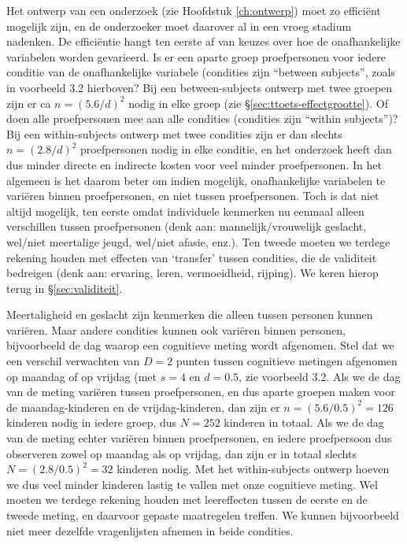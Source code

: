 \documentclass[
]{book}
\begin{document}
Het ontwerp van een onderzoek (zie
Hoofdstuk \ref{ch:ontwerp}) moet zo efficiënt mogelijk zijn, en de
onderzoeker moet daarover al in een vroeg stadium nadenken. De
efficiëntie hangt ten eerste af van keuzes over hoe de onafhankelijke
variabelen worden gevarieerd. Is er een aparte groep proefpersonen voor
iedere conditie van de onafhankelijke variabele (condities zijn ``between
subjects'', zoals in voorbeeld 3.2 hierboven? Bij een between-subjects
ontwerp met twee groepen zijn er ca \(n=(5.6/d)^2\) nodig in elke groep \citep{Gelm07}
(zie §\ref{sec:ttoets-effectgrootte}). Of doen alle proefpersonen mee
aan alle condities (condities zijn ``within subjects'')? Bij een
within-subjects ontwerp met twee condities zijn er dan slechts
\(n=(2.8/d)^2\) proefpersonen nodig in elke conditie, en het onderzoek
heeft dan dus minder directe en indirecte kosten voor veel minder
proefpersonen. In het algemeen is het daarom beter om indien mogelijk,
onafhankelijke variabelen te variëren binnen proefpersonen, en niet
tussen proefpersonen. Toch is dat niet altijd mogelijk, ten eerste omdat
individuele kenmerken nu eenmaal alleen verschillen tussen proefpersonen
(denk aan: mannelijk/vrouwelijk geslacht, wel/niet meertalige jeugd,
wel/niet afasie, enz.). Ten tweede moeten we terdege rekening houden met
effecten van `transfer' tussen condities, die de validiteit bedreigen
(denk aan: ervaring, leren, vermoeidheid, rijping). We keren hierop
terug in §\ref{sec:validiteit}.

Meertaligheid en geslacht zijn kenmerken die alleen tussen personen
kunnen variëren. Maar andere condities kunnen ook variëren binnen
personen, bijvoorbeeld de dag waarop een cognitieve meting wordt
afgenomen. Stel dat we een verschil verwachten van \(D=2\) punten tussen
cognitieve metingen afgenomen op maandag of op vrijdag (met \(s=4\) en
\(d=0.5\), zie voorbeeld 3.2. Als we de dag van de meting variëren
tussen proefpersonen, en dus aparte groepen maken voor de
maandag-kinderen en de vrijdag-kinderen, dan zijn er \(n=(5.6/0.5)^2=126\)
kinderen nodig in iedere groep, dus \(N=252\) kinderen in totaal. Als we
de dag van de meting echter variëren binnen proefpersonen, en iedere
proefpersoon dus observeren zowel op maandag als op vrijdag, dan zijn er in totaal
slechts \(N=(2.8/0.5)^2=32\) kinderen nodig. Met het
within-subjects ontwerp hoeven we dus veel minder kinderen lastig te
vallen met onze cognitieve meting. Wel moeten we terdege rekening houden
met leereffecten tussen de eerste en de tweede meting, en daarvoor
gepaste maatregelen treffen. We kunnen bijvoorbeeld niet meer dezelfde
vragenlijsten afnemen in beide condities.
\end{document}
